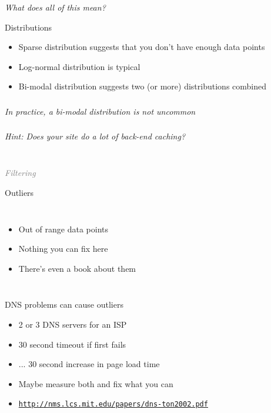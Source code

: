 \documentclass{beamer}
\newcommand{\innersplash}[1]{
  \begin{center}
    \large \textrm{\textit{ #1 } }
  \end{center}
}
\newcommand{\splashslide}[2][{}]{
  \begin{frame}
  \frametitle{#1}
  \innersplash{#2}
  \end{frame}
}
\newcommand{\leadinslide}[2]{
  \splashslide{
     {\fontsize{150}{20}\selectfont{\raisebox{0pt}[90pt][0pt]{\textcolor{light-gray}{#1}}}} \\ \huge \textcolor{gray}{#2}
  }
}
\begin{document}
\splashslide{What does all of this mean?}

\begin{frame}{Distributions}
\begin{itemize}
  \item Sparse distribution suggests that you don't have enough data points
  \item Log-normal distribution is typical
  \item Bi-modal distribution suggests two (or more) distributions combined
\end{itemize}
\end{frame}

\splashslide{In practice, a bi-modal distribution is not uncommon}

\splashslide{Hint: Does your site do a lot of back-end caching?}

\leadinslide{2-2}{Filtering}

\begin{frame}{Outliers}
  \begin{columns}[t]
  \begin{itemize}
  \item<2-> Out of range data points
  \item<3-> Nothing you can fix here
  \item<4-> There's even a book about them
  \end{itemize}
  \end{columns}
\end{frame}

\begin{frame}{DNS problems can cause outliers}
  \begin{itemize}
  \item 2 or 3 DNS servers for an ISP
  \item 30 second timeout if first fails
  \item ... 30 second increase in page load time
  \item Maybe measure both and fix what you can
  \item \href{http://nms.lcs.mit.edu/papers/dns-ton2002.pdf}{\scriptsize{\texttt{http://nms.lcs.mit.edu/papers/dns-ton2002.pdf}}}
  \end{itemize}
\end{frame}
\end{document}
